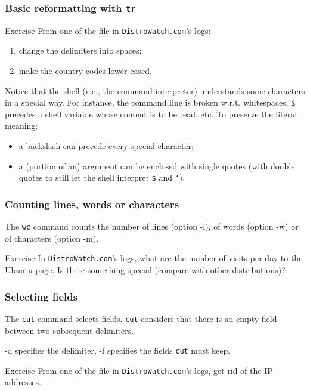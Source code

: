 \documentclass{beamer}
\newcommand{\ie}{i.\,e.}
\begin{document}
\begin{frame}
  \frametitle{Basic reformatting with \texttt{tr}}
  \begin{exampleblock}{Exercise}
    From one of the file in \texttt{DistroWatch.com}'s logs:
    \begin{enumerate}
    \item change the delimiters into spaces;
    \item make the country codes lower cased.
    \end{enumerate}
  \end{exampleblock}

  \vfill

  Notice that the shell (\ie, the command interpreter) understands
  some characters in a special way. For instance, the command line is
  broken w.r.t. whitespaces, \texttt{\$} precedes a shell variable
  whose content is to be read, etc. To preserve the literal meaning:
  \begin{itemize}
  \item a backslash can precede every special character;
  \item a (portion of an) argument can be enclosed with single quotes
    (with double quotes to still let the shell interpret \texttt{\$}
    and \texttt{`}).
  \end{itemize}
\end{frame}

\begin{frame}
  \frametitle{Counting lines, words or characters}
  The \texttt{wc} command counts the number of lines (option -l), of
  words (option -w) or of characters (option -m).

  \vfill
  \pause

  \begin{exampleblock}{Exercise}
    In \texttt{DistroWatch.com}'s logs, what are the number of visits
    per day to the Ubuntu page. Is there something special (compare
    with other distributions)?
  \end{exampleblock}
\end{frame}

\begin{frame}
  \frametitle{Selecting fields}
  The \texttt{cut} command selects fields. \texttt{cut} considers that
  there is an empty field between two subsequent delimiters.

  \vfill

  -d specifies the delimiter, -f specifies the fields \texttt{cut}
  must keep.

  \vfill
  \pause

  \begin{exampleblock}{Exercise}
    From one of the file in \texttt{DistroWatch.com}'s logs, get rid
    of the IP addresses.
  \end{exampleblock}
\end{frame}
\end{document}
